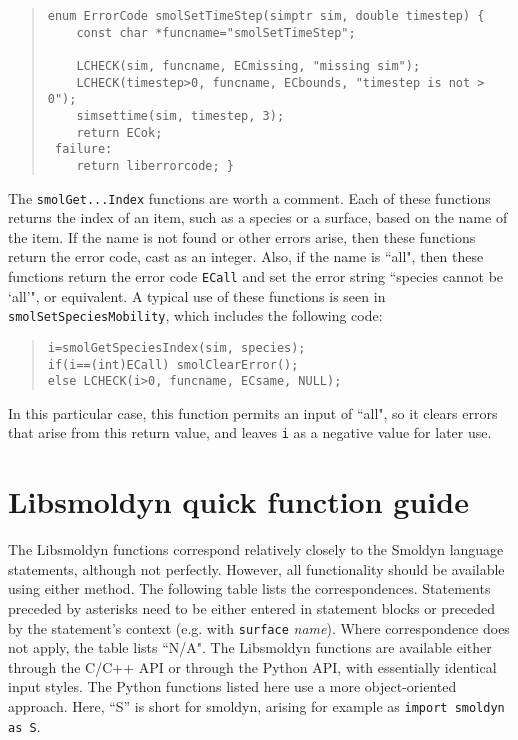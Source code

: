 \documentclass {book}
\newcommand {\ttt} {\texttt}
\begin{document}
\begin{quote}
\begin{lstlisting}
enum ErrorCode smolSetTimeStep(simptr sim, double timestep) {
	const char *funcname="smolSetTimeStep";

	LCHECK(sim, funcname, ECmissing, "missing sim");
	LCHECK(timestep>0, funcname, ECbounds, "timestep is not > 0");
	simsettime(sim, timestep, 3);
	return ECok;
 failure:
	return liberrorcode; }
\end{lstlisting}
\end{quote}

The \ttt{smolGet...Index} functions are worth a comment. Each of these functions returns the index of an item, such as a species or a surface, based on the name of the item. If the name is not found or other errors arise, then these functions return the error code, cast as an integer. Also, if the name is ``all", then these functions return the error code \ttt{ECall} and set the error string ``species cannot be `all'", or equivalent. A typical use of these functions is seen in \ttt{smolSetSpeciesMobility}, which includes the following code:

\begin{quote}
\begin{lstlisting}
i=smolGetSpeciesIndex(sim, species);
if(i==(int)ECall) smolClearError();
else LCHECK(i>0, funcname, ECsame, NULL);
\end{lstlisting}
\end{quote}

In this particular case, this function permits an input of ``all", so it clears errors that arise from this return value, and leaves \ttt{i} as a negative value for later use.


\chapter{Libsmoldyn quick function guide}

The Libsmoldyn functions correspond relatively closely to the Smoldyn language statements, although not perfectly. However, all functionality should be available using either method. The following table lists the correspondences. Statements preceded by asterisks need to be either entered in statement blocks or preceded by the statement's context (e.g. with \ttt{surface} \emph{name}). Where correspondence does not apply, the table lists ``N/A". The Libsmoldyn functions are available either through the C/C++ API or through the Python API, with essentially identical input styles. The Python functions listed here use a more object-oriented approach. Here, ``S'' is short for smoldyn, arising for example as \ttt{import smoldyn as S}.
\end{document}
